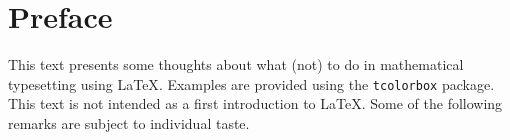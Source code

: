 
\chapter{Preface}

This text presents some thoughts about what (not) to do in mathematical typesetting using {\LaTeX}.
Examples are provided using the \texttt{tcolorbox} package.
This text is not intended as a first introduction to {\LaTeX}.
Some of the following remarks are subject to individual taste.
